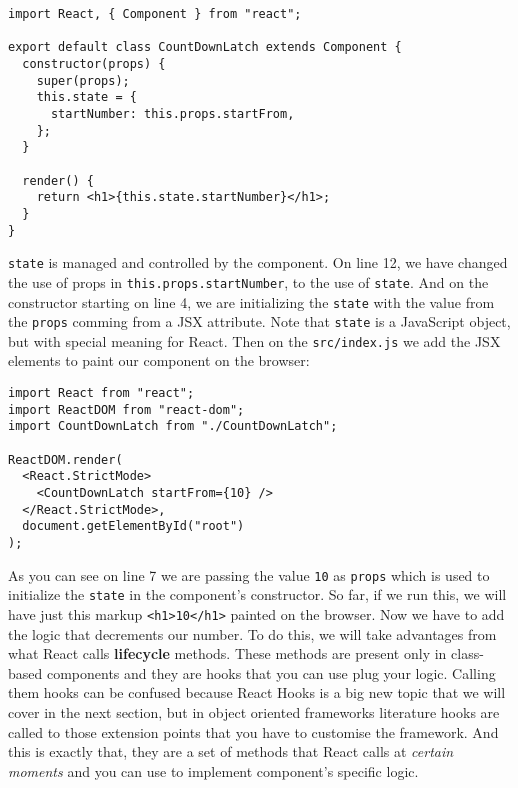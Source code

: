 \documentclass[a4paper, oneside, titlepage, 12pt]{book}
\begin{document}
\begin{verbatim}
import React, { Component } from "react";

export default class CountDownLatch extends Component {
  constructor(props) {
    super(props);
    this.state = {
      startNumber: this.props.startFrom,
    };
  }

  render() {
    return <h1>{this.state.startNumber}</h1>;
  }
}
\end{verbatim}
 
\texttt{state} is managed and controlled by the component. On line 12, we have changed the use of props in \texttt{this.props.startNumber}, to the use of \texttt{state}. And on the constructor starting on line 4, we are initializing the \texttt{state} with the value from the \texttt{props} comming from a JSX attribute. Note that \texttt{state} is a JavaScript object, but with special meaning for React. Then on the \texttt{src/index.js} we add the JSX elements to paint our component on the browser:

\begin{verbatim}
import React from "react";
import ReactDOM from "react-dom";
import CountDownLatch from "./CountDownLatch";

ReactDOM.render(
  <React.StrictMode>
    <CountDownLatch startFrom={10} />
  </React.StrictMode>,
  document.getElementById("root")
);
\end{verbatim}

As you can see on line 7 we are passing the value \texttt{10} as \texttt{props} which is used to initialize the \texttt{state} in the component's constructor. So far, if we run this, we will have just this markup \texttt{<h1>10</h1>} painted on the browser. Now we have to add the logic that decrements our number. To do this, we will take advantages from what React calls \textbf{lifecycle} methods. These methods are present only in class-based components and they are hooks that you can use plug your logic. Calling them hooks can be confused because React Hooks is a big new topic that we will cover in the next section, but in object oriented frameworks literature hooks are called to those extension points that you have to customise the framework. And this is exactly that, they are a set of methods that React calls at \textit{certain moments} and you can use to implement component's specific logic.
\newline
\end{document}
